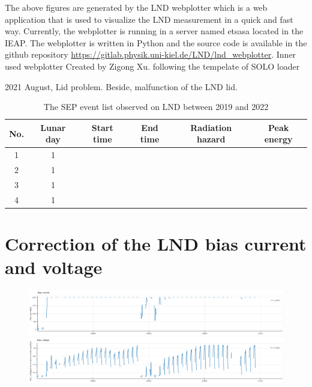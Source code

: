 The above figures are generated by the LND webplotter which is a web application that is used to visualize the LND measurement in a quick and fast way. 
Currently, the webplotter is running in a server named etsasa located in the IEAP.
The webplotter is written in Python and the source code is available in the github repository \url{https://gitlab.physik.uni-kiel.de/LND/lnd_webplotter}. 
Inner used webplotter 
Created by Zigong Xu. following the tempelate of SOLO loader

2021 August, Lid problem. Beside, malfunction of the LND lid.

\begin{table}[!h]
    \centering
    \caption[The SEP event list observed on LND]{The SEP event list observed on LND between 2019 and 2022}
\begin{tabular}{cccccc}
    \hline
    No.     & Lunar day & Start time    & End time      & Radiation hazard  & Peak energy\\
    \hline
    1       & 1         &               &               &  &\\
    2       & 1         &               &               &   &\\
    3       & 1         &               &               &   &\\
    4       & 1         &               &               &   &\\    
    \hline
\end{tabular}
\label{Tab:appendix_LND_SEP_list}
\end{table}

\section{Correction of the LND bias current and voltage}
\clearpage
\begin{figure}
    \centering
    \includegraphics[angle = 90]{images/lnd_bias_current.png}
    \includegraphics{images/lnd_bias_voltage.png}
    \caption{}
    \label{Fig:appendix_LND_bias_current_voltage}
\end{figure}


